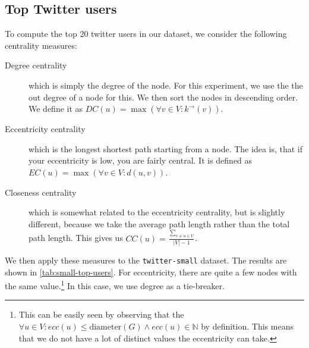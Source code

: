 \documentclass[a4paper,10pt,hidelinks]{article}
\begin{document}
\subsection{Top Twitter users}
To compute the top 20 twitter users in our dataset, we consider the following centrality measures:

\begin{description}
	\item[Degree centrality] which is simply the degree of the node. For this experiment, we use the the out degree of a node for this. We then sort the nodes in descending order. We define it as $DC(u) = \max(\forall v \in V : k^\rightarrow(v))$.

	\item[Eccentricity centrality] which is the longest shortest path starting from a node. The idea is, that if your eccentricity is low, you are fairly central. It is defined as $EC(u) = \max(\forall v \in V : d(u, v))$.

	\item[Closeness centrality] which is somewhat related to the eccentricity centrality, but is slightly different, because we take the average path length rather than the total path length. This gives us $CC(u) = \frac{\sum_{v \neq u \in V}}{|V| - 1}$.
\end{description}

We then apply these measures to the \texttt{twitter-small} dataset. The results are shown in \autoref{tab:small-top-users}. For eccentricity, there are quite a few nodes with the same value.\footnote{This can be easily seen by observing that the $\forall u \in V: ecc(u) \leq \text{diameter}(G) \land ecc(u) \in \mathbb{N}$ by definition. This means that we do not have a lot of distinct values the eccentricity can take.} In this case, we use degree as a tie-breaker.
\end{document}
